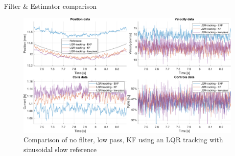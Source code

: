 \begin{frame}{Filter \& Estimator comparison}

    \vspace{9pt}

    \begin{figure}[H]
        \centering
        \includegraphics[width=1\linewidth]{./img/MATLAB/results/sinusoidal_slow_linear_star_star_zoomed_KF_EKF_lowpass.pdf}
        \caption{Comparison of no filter, low pass, KF using an LQR tracking with sinusoidal slow reference}
    \end{figure}

\end{frame}



